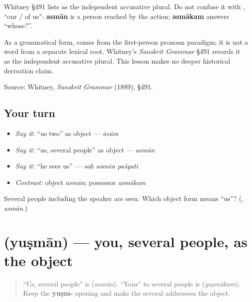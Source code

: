 Whitney §491 lists \textbf{} as the independent accusative plural. Do not confuse it with \textbf{}, “our / of us”: \textbf{asmān} is a person reached by the action; \textbf{asmākam} answers “whose?”.

\begin{cousinweb}
As a grammatical form, \textbf{} comes from the first-person pronoun paradigm; it is not a word from a separate lexical root. Whitney's \emph{Sanskrit Grammar} §491 records it as the independent accusative plural. This lesson makes no deeper historical derivation claim.

Source: Whitney, \emph{Sanskrit Grammar} (1889), §491.
\end{cousinweb}

\subsection*{Your turn}
\begin{itemize}
\raggedright
  \item \emph{Say it:} “us two” as object — \emph{āvām}
  \item \emph{Say it:} “us, several people” as object — \emph{asmān}
  \item \emph{Say it:} “he sees us” — \emph{saḥ asmān paśyati}
  \item \emph{Contrast:} object \emph{asmān}; possessor \emph{asmākam}
\end{itemize}

\begin{tcolorbox}[breakable,colback=teal!4,colframe=teal!35!black,title={Before you move on}]
Several people including the speaker are seen. Which object form means “us”? (\textbf{}, \emph{asmān}.)
\end{tcolorbox}
\section[\texorpdfstring{\sk{युष्मान्} (yuṣmān)}{युष्मान् (yuṣmān)}]{ (yuṣmān) — you, several people, as the object}

\label{lesson:SA-C262-yusman}



\begin{quote}
“Us, several people” is \textbf{} (\emph{asmān}). “Your” to several people is \textbf{} (\emph{yuṣmākam}). Keep the \textbf{yuṣm-} opening and make the several addressees the object.
\end{quote}

